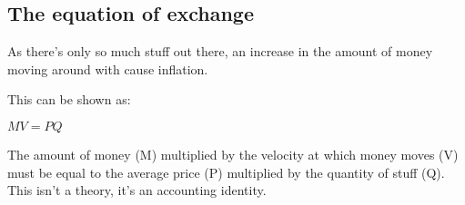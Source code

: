 
\subsection{The equation of exchange}

As there’s only so much stuff out there, an increase in the amount of money moving around with cause inflation.

This can be shown as:

\(MV=PQ\)

The amount of money (M) multiplied by the velocity at which money moves (V) must be equal to the average price (P) multiplied by the quantity of stuff (Q). This isn’t a theory, it’s an accounting identity.

